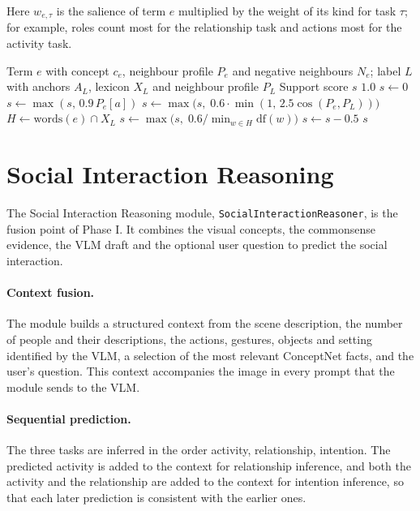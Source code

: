\documentclass[12pt,a4paper,oneside]{report}
\newcommand{\code}[1]{\texttt{#1}}
\begin{document}
Here $w_{e,\tau}$ is the salience of term $e$ multiplied by the weight of its
kind for task $\tau$; for example, roles count most for the relationship task
and actions most for the activity task.

\begin{algorithm}[htbp]
\caption{Support of one evidence term for one label}
\label{alg:support}
\begin{algorithmic}[1]
\Require Term $e$ with concept $c_e$, neighbour profile $P_e$ and negative neighbours $N_e$; label $L$ with anchors $A_L$, lexicon $X_L$ and neighbour profile $P_L$
\Ensure Support score $s$
  \State \Return $1.0$ 
\EndIf
\State $s \gets 0$
    \State $s \gets \max(s,\, 0.9\, P_e[a])$ 
  \EndIf
\EndFor
\State $s \gets \max\big(s,\; 0.6 \cdot \min(1,\, 2.5 \cos(P_e, P_L))\big)$ 
\State $H \gets \mathrm{words}(e) \cap X_L$
  \State $s \gets \max\big(s,\; 0.6 / \min_{w \in H} \mathrm{df}(w)\big)$ 
\EndIf
{}
  \State $s \gets s - 0.5$ 
\EndIf
\State \Return $s$
\end{algorithmic}
\end{algorithm}

\section{Social Interaction Reasoning}
\label{sec:reasoning}

The Social Interaction Reasoning module, \code{SocialInteractionReasoner}, is
the fusion point of Phase I. It combines the visual concepts, the commonsense
evidence, the VLM draft and the optional user question to predict the social
interaction.

\paragraph{Context fusion.} The module builds a structured context from the
scene description, the number of people and their descriptions, the actions,
gestures, objects and setting identified by the VLM, a selection of the most
relevant ConceptNet facts, and the user's question. This context accompanies
the image in every prompt that the module sends to the VLM.

\paragraph{Sequential prediction.} The three tasks are inferred in the order
activity, relationship, intention. The predicted activity is added to the
context for relationship inference, and both the activity and the relationship
are added to the context for intention inference, so that each later prediction
is consistent with the earlier ones.
\end{document}
